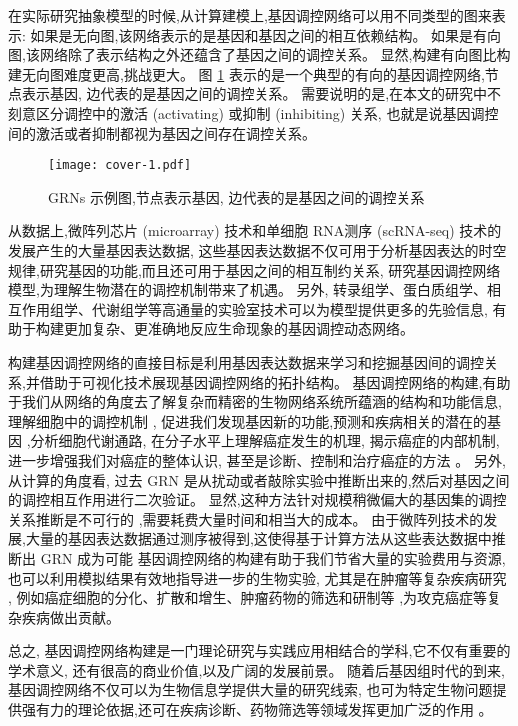 在实际研究抽象模型的时候,从计算建模上,基因调控网络可以用不同类型的图来表示:
如果是无向图,该网络表示的是基因和基因之间的相互依赖结构。
如果是有向图,该网络除了表示结构之外还蕴含了基因之间的调控关系。
显然,构建有向图比构建无向图难度更高,挑战更大。
图 \ref{cover-1} 表示的是一个典型的有向的基因调控网络,节点表示基因, 边代表的是基因之间的调控关系。
需要说明的是,在本文的研究中不刻意区分调控中的激活 (activating) 或抑制 (inhibiting) 关系,
也就是说基因调控间的激活或者抑制都视为基因之间存在调控关系。
\begin{figure}[!htbp]
    \centering
    \texttt{[image: cover-1.pdf]}
    \caption{GRNs 示例图,节点表示基因, 边代表的是基因之间的调控关系}
    \label{cover-1}
\end{figure}

从数据上,微阵列芯片 (microarray) 技术和单细胞 RNA测序 (scRNA-seq) 技术的发展产生的大量基因表达数据,
这些基因表达数据不仅可用于分析基因表达的时空规律,研究基因的功能,而且还可用于基因之间的相互制约关系,
研究基因调控网络模型,为理解生物潜在的调控机制带来了机遇。
另外, 转录组学、蛋白质组学、相互作用组学、代谢组学等高通量的实验室技术可以为模型提供更多的先验信息,
有助于构建更加复杂、更准确地反应生命现象的基因调控动态网络。

构建基因调控网络的直接目标是利用基因表达数据来学习和挖掘基因间的调控关系,并借助于可视化技术展现基因调控网络的拓扑结构。
基因调控网络的构建,有助于我们从网络的角度去了解复杂而精密的生物网络系统所蕴涵的结构和功能信息,
理解细胞中的调控机制 ,
促进我们发现基因新的功能,预测和疾病相关的潜在的基因 ,分析细胞代谢通路,
在分子水平上理解癌症发生的机理,
揭示癌症的内部机制,进一步增强我们对癌症的整体认识,
甚至是诊断、控制和治疗癌症的方法 。
另外,从计算的角度看,
过去 GRN 是从扰动或者敲除实验中推断出来的,然后对基因之间的调控相互作用进行二次验证。
显然,这种方法针对规模稍微偏大的基因集的调控关系推断是不可行的 ,需要耗费大量时间和相当大的成本。
由于微阵列技术的发展,大量的基因表达数据通过测序被得到,这使得基于计算方法从这些表达数据中推断出 GRN 成为可能 
基因调控网络的构建有助于我们节省大量的实验费用与资源,
也可以利用模拟结果有效地指导进一步的生物实验,
尤其是在肿瘤等复杂疾病研究 ,
例如癌症细胞的分化、扩散和增生、肿瘤药物的筛选和研制等 ,为攻克癌症等复杂疾病做出贡献。


总之, 基因调控网络构建是一门理论研究与实践应用相结合的学科,它不仅有重要的学术意义,
还有很高的商业价值,以及广阔的发展前景。
随着后基因组时代的到来,基因调控网络不仅可以为生物信息学提供大量的研究线索,
也可为特定生物问题提供强有力的理论依据,还可在疾病诊断、药物筛选等领域发挥更加广泛的作用 。

